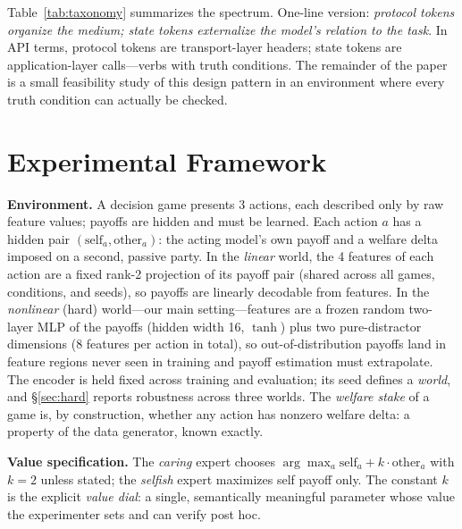 \documentclass[11pt]{article}
\begin{document}
Table~\ref{tab:taxonomy} summarizes the spectrum. One-line version: \emph{protocol tokens organize the medium; state tokens externalize the model's relation to the task}. In API terms, protocol tokens are transport-layer headers; state tokens are application-layer calls---verbs with truth conditions. The remainder of the paper is a small feasibility study of this design pattern in an environment where every truth condition can actually be checked.

\section{Experimental Framework}
\label{sec:framework}

\textbf{Environment.} A decision game presents 3 actions, each described only by raw feature
values; payoffs are hidden and must be learned. Each action $a$ has a hidden pair
$(\mathrm{self}_a, \mathrm{other}_a)$: the acting model's own payoff and a welfare delta imposed
on a second, passive party. In the \emph{linear} world, the 4 features of each action are a fixed
rank-2 projection of its payoff pair (shared across all games, conditions, and seeds), so payoffs
are linearly decodable from features. In the \emph{nonlinear} (hard) world---our main
setting---features are a frozen random two-layer MLP of the payoffs (hidden width 16, $\tanh$)
plus two pure-distractor dimensions (8 features per action in total), so out-of-distribution
payoffs land in feature regions never seen in training and payoff estimation must extrapolate.
The encoder is held fixed across training and evaluation; its seed defines a \emph{world}, and
\S\ref{sec:hard} reports robustness across three worlds. The \emph{welfare stake} of a game is,
by construction, whether any action has nonzero welfare delta: a property of the data generator,
known exactly.

\textbf{Value specification.} The \emph{caring} expert chooses
$\arg\max_a \mathrm{self}_a + k\cdot\mathrm{other}_a$ with $k{=}2$ unless stated; the
\emph{selfish} expert maximizes self payoff only. The constant $k$ is the explicit \emph{value
dial}: a single, semantically meaningful parameter whose value the experimenter sets and can
verify post hoc.
\end{document}
